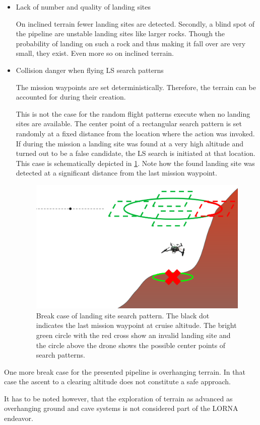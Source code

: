 \begin{itemize}
    \item Lack of number and quality of landing sites

    On inclined terrain fewer landing sites are detected. Secondly, a blind spot of the pipeline are unstable landing sites like larger rocks. Though the probability of landing on such a rock and thus making it fall over are very small, they exist. Even more so on inclined terrain.

    \item Collision danger when flying LS search patterns

    The mission waypoints are set deterministically. Therefore, the terrain can be accounted for during their creation. 
    
    This is not the case for the random flight patterns execute when no landing sites are available. The center point of a rectangular search pattern is set randomly at a fixed distance from the location where the action was invoked. If during the mission a landing site was found at a very high altitude and turned out to be a false candidate, the LS search is initiated at that location. This case is schematically depicted in \cref{fig:search_pattern_collision}. Note how the found landing site was detected at a significant distance from the last mission waypoint. 

    \begin{figure}[h]
        \centering
        \includegraphics[scale=0.35]{images/evaluation/search_pattern_collision.png}
        \caption{Break case of landing site search pattern. The black dot indicates the last mission waypoint at cruise altitude. The bright green circle with the red cross show an invalid landing site and the circle above the drone shows the possible center points of search patterns.}
        \label{fig:search_pattern_collision}
    \end{figure}
\end{itemize}

One more break case for the presented pipeline is overhanging terrain. In that case the ascent to a clearing altitude does not constitute a safe approach.

It has to be noted however, that the exploration of terrain as advanced as overhanging ground and cave systems is not considered part of the LORNA endeavor.